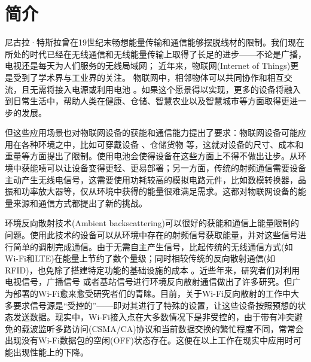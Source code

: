 
\chapter{简介}
\label{chap:introduction}

尼古拉·特斯拉曾在19世纪末畅想能量传输和通信能够摆脱线材的限制。我们现在所处的时代已经在无线通信和无线能量传输上取得了长足的进步——不论是广播，电视还是每天为人们服务的无线局域网；
近年来，物联网(Internet of Things)更是受到了学术界与工业界的关注。
物联网中，相邻物体可以共同协作和相互交流，且无需将接入电源或利用电池\cite{gershenfeld2004internet}
。如果这个愿景得以实现，更多的设备将融入到日常生活中，帮助人类在健康、仓储、智慧农业以及智慧城市等方面取得更进一步的发展。

但这些应用场景也对物联网设备的获能和通信能力提出了要求：物联网设备可能应用在各种环境之中，比如可穿戴设备\cite{baker2017internet}
、仓储货物\cite{lee2018design}
等，这就对设备的尺寸、成本和重量等方面提出了限制。使用电池会使得设备在这些方面上不得不做出让步。从环境中获能啧可以让设备变得更轻、更易部署；另一方面，传统的射频通信需要设备主动产生无线电信号，这需要使用功耗较高的模拟电路元件，比如数模转换器，晶振和功率放大器等，仅从环境中获得的能量很难满足需求。这都对物联网设备的能量来源和通信方式都提出了新的挑战。

环境反向散射技术(Ambient backscattering)可以很好的获能和通信上能量限制的问题。使用此技术的设备可以从环境中存在的射频信号获取能量，并对这些信号进行简单的调制完成通信。由于无需自主产生信号，比起传统的无线通信方式(如Wi-Fi和LTE)在能量上节约了数个量级；同时相较传统的反向散射通信(如RFID)，也免除了搭建特定功能的基础设施的成本\cite{liu2013ambient}
。近些年来，研究者们对利用电视信号\cite{liu2013ambient}，广播信号\cite{wang2017fm}
或者基站信号\cite{parks2014sifting}进行环境反向散射通信做出了许多研究。但广为部署的Wi-Fi愈来愈受研究者们的青睐。目前，关于Wi-Fi反向散射的工作中大多要求信号源是“受控的”——即对其进行了特殊的设置，让这些设备按照预想的状态发送数据。现实中，Wi-Fi接入点在大多数情况下是非受控的，由于带有冲突避免的载波监听多路访问(CSMA/CA)协议和当前数据交换的繁忙程度不同，常常会出现没有Wi-Fi数据包的空闲(OFF)状态存在。这便在以上工作在现实中应用时可能出现性能上的下降。

